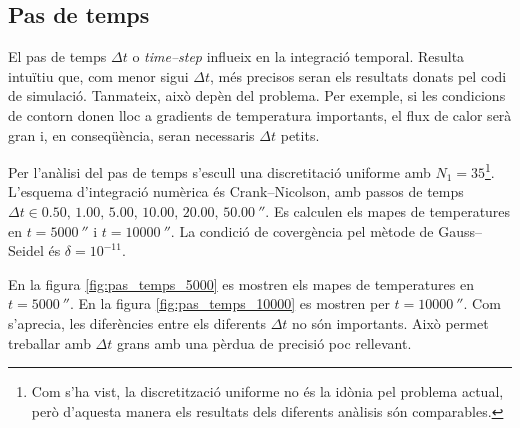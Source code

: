 
\subsection{Pas de temps}

El pas de temps $\Delta t$ o \emph{time--step} influeix en la integració temporal. Resulta intuïtiu que, com menor sigui $\Delta t$, més precisos seran els resultats donats pel codi de simulació. Tanmateix, això depèn del problema. Per exemple, si les condicions de contorn donen lloc a gradients de temperatura importants, el flux de calor serà gran i, en conseqüència, seran necessaris $\Delta t$ petits. 

Per l'anàlisi del pas de temps s'escull una discretitació uniforme amb $N_1 = 35$\footnote{Com s'ha vist, la discretització uniforme no és la idònia pel problema actual, però d'aquesta manera els resultats dels diferents anàlisis són comparables.}. L'esquema d'integració numèrica és Crank--Nicolson, amb passos de temps $\Delta t \in {0.50, \, 1.00, \, 5.00, \, 10.00, \, 20.00, \, 50.00} \ \second$. Es calculen els mapes de temperatures en $t = 5000 \ \second$ i $t = 10000 \ \second$. La condició de covergència pel mètode de Gauss--Seidel és $\delta = 10^{-11}$. 

En la figura \ref{fig:pas_temps_5000} es mostren els mapes de temperatures en $t = 5000 \ \second$. En la figura \ref{fig:pas_temps_10000} es mostren per $t = 10000 \ \second$. Com s'aprecia, les diferències entre els diferents $\Delta t$ no són importants. Això permet treballar amb $\Delta t$ grans amb una pèrdua de precisió poc rellevant.
 
